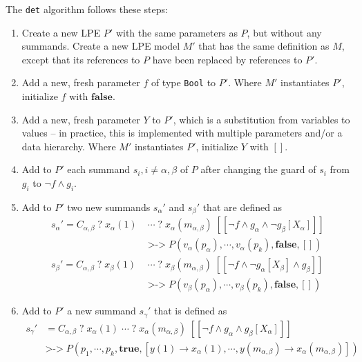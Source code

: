 The \texttt{det} algorithm follows these steps:

\begin{enumerate}
\item Create a new LPE $P'$ with the same parameters as $P$, but without any summands.
Create a new LPE model $M'$ that has the same definition as $M$, except that its references to $P$ have been replaced by references to $P'$.

\item Add a new, fresh parameter $f$ of type \texttt{Bool} to $P'$.
Where $M'$ instantiates $P'$, initialize $f$ with $\textbf{false}$.

\item Add a new, fresh parameter $Y$ to $P'$, which is a substitution from variables to values -- in practice, this is implemented with multiple parameters and/or a data hierarchy.
Where $M'$ instantiates $P'$, initialize $Y$ with $[]$.

\item Add to $P'$ each summand $s_i, i \neq \alpha, \beta$ of $P$ after changing the guard of $s_i$ from $g_i$ to $\neg f \land g_i$.

\item Add to $P'$ two new summands ${s_\alpha}'$ and ${s_\beta}'$ that are defined as
\begin{align*}
{s_\alpha}' = C_{\alpha,\beta} \; \texttt{?} \; x_\alpha(1) \; &\cdots{} \; \texttt{?} \; x_\alpha(m_{\alpha,\beta}) \; [[\neg f \land g_\alpha \land \neg g_\beta[X_\alpha]]] \\
&\texttt{>->} \; P(v_\alpha(p_\alpha), \cdots{}, v_\alpha(p_k), \textbf{false}, []) \\
{s_\beta}' = C_{\alpha,\beta} \; \texttt{?} \; x_\beta(1) \; &\cdots{} \; \texttt{?} \; x_\beta(m_{\alpha,\beta}) \; [[\neg f \land \neg g_\alpha[X_\beta] \land g_\beta]] \\
&\texttt{>->} \; P(v_\beta(p_\alpha), \cdots{}, v_\beta(p_k), \textbf{false}, [])
\end{align*}

\item Add to $P'$ a new summand ${s_\gamma}'$ that is defined as
\begin{align*}
{s_\gamma}' &= C_{\alpha,\beta} \; \texttt{?} \; x_\alpha(1) \; \cdots{} \; \texttt{?} \; x_\alpha(m_{\alpha,\beta}) \; [[\neg f \land g_\alpha \land g_\beta[X_\alpha]]] \\
&\texttt{>->} \; P(p_1, \cdots{}, p_k, \textbf{true}, [y(1) \rightarrow x_\alpha(1), \cdots{}, y(m_{\alpha,\beta}) \rightarrow x_\alpha(m_{\alpha,\beta})])
\end{align*}


\end{enumerate}
